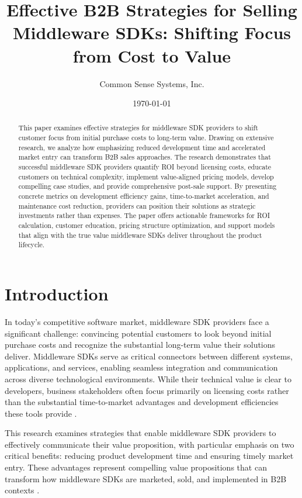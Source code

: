 \documentclass[11pt,a4paper]{article}
\title{\LARGE\textbf{Effective B2B Strategies for Selling Middleware SDKs: Shifting Focus from Cost to Value}}
\author{Common Sense Systems, Inc.}
\date{\today}
\begin{document}
\maketitle
\thispagestyle{fancy}

\begin{abstract}
This paper examines effective strategies for middleware SDK providers to shift customer focus from initial purchase costs to long-term value. Drawing on extensive research, we analyze how emphasizing reduced development time and accelerated market entry can transform B2B sales approaches. The research demonstrates that successful middleware SDK providers quantify ROI beyond licensing costs, educate customers on technical complexity, implement value-aligned pricing models, develop compelling case studies, and provide comprehensive post-sale support. By presenting concrete metrics on development efficiency gains, time-to-market acceleration, and maintenance cost reduction, providers can position their solutions as strategic investments rather than expenses. The paper offers actionable frameworks for ROI calculation, customer education, pricing structure optimization, and support models that align with the true value middleware SDKs deliver throughout the product lifecycle.
\end{abstract}

\tableofcontents
\newpage

\section{Introduction}

In today's competitive software market, middleware SDK providers face a significant challenge: convincing potential customers to look beyond initial purchase costs and recognize the substantial long-term value their solutions deliver. Middleware SDKs serve as critical connectors between different systems, applications, and services, enabling seamless integration and communication across diverse technological environments. While their technical value is clear to developers, business stakeholders often focus primarily on licensing costs rather than the substantial time-to-market advantages and development efficiencies these tools provide \citep{IBMwebMethodsB2B2024}.

This research examines strategies that enable middleware SDK providers to effectively communicate their value proposition, with particular emphasis on two critical benefits: reducing product development time and ensuring timely market entry. These advantages represent compelling value propositions that can transform how middleware SDKs are marketed, sold, and implemented in B2B contexts \citep{IBMwebMethodsB2B2024}.
\end{document}
